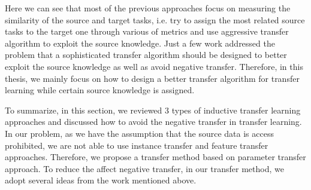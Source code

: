 Here we can see that most of the previous approaches focus on measuring the similarity of the source and target tasks, i.e. try to assign the most related source tasks to the target one through various of metrics and use aggressive transfer algorithm to exploit the source knowledge. Just a few work \cite{tommasi2010safety} \cite{kuzborskij2013stability} addressed the problem that a sophisticated transfer algorithm should be designed to better exploit the source knowledge as well as avoid negative transfer. Therefore, in this thesis, we mainly focus on how to design a better transfer algorithm for transfer learning while certain source knowledge is assigned. 

To summarize, in this section, we reviewed 3 types of inductive transfer learning approaches and discussed how to avoid the negative transfer in transfer learning. In our problem, as we have the assumption that the source data is access prohibited, we are not able to use instance transfer and feature transfer approaches. Therefore, we propose a transfer method based on parameter transfer approach. To reduce the affect negative transfer, in our transfer method, we adopt several ideas from the work mentioned above. 


